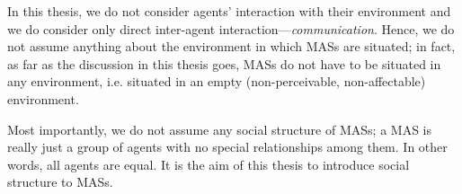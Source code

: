 In this thesis, we do not consider agents' interaction with their environment and we do consider only direct inter-agent interaction---\textit{communication}.
Hence, we do not assume anything about the environment in which MASs are situated; in fact, as far as the discussion in this thesis goes, MASs do not have to be situated in any environment, i.e. situated in an empty (non-perceivable, non-affectable) environment.

Most importantly, we do not assume any social structure of MASs; a MAS is really just a group of agents with no special relationships among them.
In other words, all agents are equal.
It is the aim of this thesis to introduce social structure to MASs.